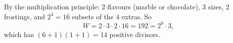 By the multiplication principle: $2$ flavours (marble or chocolate), $3$ sizes, $2$ frostings, and $2^4=16$ subsets of the $4$ extras. So
\[W=2\cdot3\cdot2\cdot16=192=2^6\cdot3,\]
which has $(6+1)(1+1)=\boxed{14}$ positive divisors.
